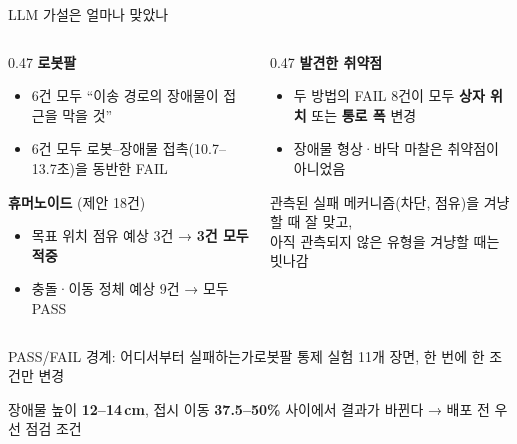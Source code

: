 \documentclass[aspectratio=169,11pt]{beamer}
\begin{document}
\begin{frame}{LLM 가설은 얼마나 맞았나}
\vspace{3mm}
\begin{columns}[T]
\begin{column}{0.47\textwidth}
\textbf{로봇팔}
\begin{itemize}
\item 6건 모두 ``이송 경로의 장애물이 접근을 막을 것''
\item 6건 모두 로봇–장애물 접촉(10.7--13.7초)을 동반한 FAIL
\end{itemize}
\vspace{3mm}
\textbf{휴머노이드} (제안 18건)
\begin{itemize}
\item 목표 위치 점유 예상 3건 → \textcolor{passc}{\textbf{3건 모두 적중}}
\item 충돌·이동 정체 예상 9건 → 모두 PASS
\end{itemize}
\end{column}
\begin{column}{0.47\textwidth}
\textbf{발견한 취약점}
\begin{itemize}
\item 두 방법의 FAIL 8건이 모두 \textbf{상자 위치} 또는 \textbf{통로 폭} 변경
\item 장애물 형상·바닥 마찰은 취약점이 아니었음
\end{itemize}
\vspace{4mm}
\colorbox{afs!10}{\parbox{0.95\linewidth}{
관측된 실패 메커니즘(차단, 점유)을 겨냥할 때 잘 맞고,\\
아직 관측되지 않은 유형을 겨냥할 때는 빗나감}}
\end{column}
\end{columns}
\end{frame}

\begin{frame}{PASS/FAIL 경계: 어디서부터 실패하는가}{로봇팔 통제 실험 11개 장면, 한 번에 한 조건만 변경}
\centering
\resizebox{0.95\textwidth}{!}{}
\vspace{3mm}

\small 장애물 높이 \textbf{12--14\,cm}, 접시 이동 \textbf{37.5--50\%} 사이에서 결과가 바뀐다 → 배포 전 우선 점검 조건
\end{frame}
\end{document}
